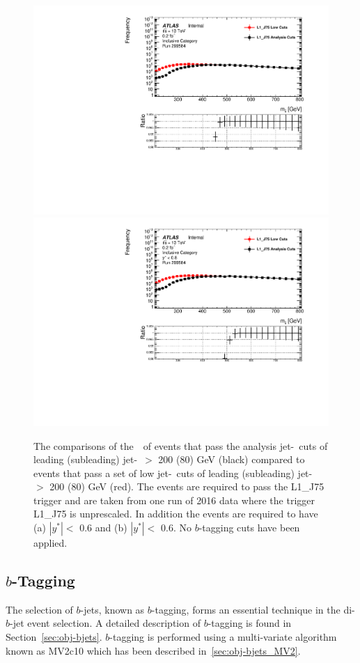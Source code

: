 \begin{figure}[!ht]
  \begin{center}
    \captionsetup[subfigure]{aboveskip=0pt,justification=centering}
     {\includegraphics[width=0.48\linewidth, angle=0]{figs/Dibjet/LowMass/evt-mjj_yStar0p6.pdf}}
     {\includegraphics[width=0.48\linewidth, angle=0]{figs/Dibjet/LowMass/evt-mjj_yStar0p8.pdf}}
  \end{center}
  \caption{The comparisons of the~\mjj~of events that pass the analysis jet-\pT~cuts of leading (subleading) jet-\pT~$>$ 200 (80) GeV (black)
    compared to events that pass a set of low jet-\pT~cuts of leading (subleading) jet-\pT~$>$ 200 (80) GeV (red).
    The events are required to pass the L1\_J75 trigger and are taken from one run of 2016 data where the trigger L1\_J75 is unprescaled.
    In addition the events are required to have (a) $|y^*| <$ 0.6 and (b) $|y^*| <$ 0.6.
    No $b$-tagging cuts have been applied.}
     \label{fig:evt-lowmass_turnon}
\end{figure}

\subsection{$b$-Tagging}
\label{sec:evt-sel-btag}

The selection of $b$-jets, known as $b$-tagging,
forms an essential technique in the di-$b$-jet event selection.
A detailed description of $b$-tagging is found in Section~\ref{sec:obj-bjets}.
$b$-tagging is performed using a multi-variate algorithm known as MV2c10 which has been described in~\ref{sec:obj-bjets_MV2}.

